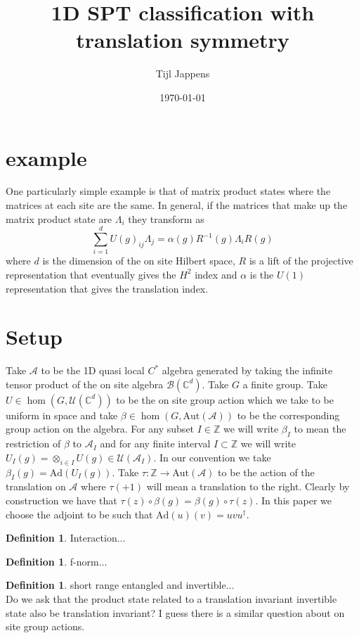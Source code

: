 \documentclass[12pt,a4paper,twoside]{article}
\title{1D SPT classification with translation symmetry}
\author{Tijl Jappens}
\date{\today}
\newcommand{\UU}{\mathcal U}
\newcommand{\BB}{\mathcal B}
\newcommand{\ZZ}{\mathbb Z}
\newcommand{\CC}{\mathbb C}
\renewcommand{\AA}{\mathcal A}
\newcommand{\Ad}{\textrm{Ad}}
\theoremstyle{definition}
\newtheorem{definition}[theorem]{Definition}
\numberwithin{equation}{section}
\begin{document}
\section{example}
One particularly simple example is that of matrix product states where the matrices at each site are the same. In general, if the matrices that make up the matrix product state are $\Lambda_i$ they transform as
\begin{equation}
	\sum_{i=1}^d U(g)_{ij}\Lambda_j=\alpha(g) R^{-1}(g)\Lambda_i R(g)
\end{equation}
where $d$ is the dimension of the on site Hilbert space, $R$ is a lift of the projective representation that eventually gives the $H^2$ index and $\alpha$ is the $U(1)$ representation that gives the translation index.
\section{Setup}
Take $\AA$ to be the 1D quasi local $C^*$ algebra generated by taking the infinite tensor product of the on site algebra $\BB(\CC^d)$. Take $G$ a finite group. Take $U\in\hom(G,\UU(\CC^d))$ to be the on site group action which we take to be uniform in space and take $\beta\in\hom(G,\text{Aut}(\AA))$ to be the corresponding group action on the algebra. For any subset $I\in\ZZ$ we will write $\beta_I$ to mean the restriction of $\beta$ to $\AA_I$ and for any finite interval $I\subset\ZZ$ we will write $U_I(g)=\otimes_{i\in I}U(g)\in\UU(\AA_I)$. In our convention we take $\beta_I(g)=\Ad(U_I(g))$. Take $\tau:\ZZ\rightarrow\text{Aut}(\AA)$ to be the action of the translation on $\AA$ where $\tau(+1)$ will mean a translation to the right. Clearly by construction we have that $\tau(z)\circ\beta(g)=\beta(g)\circ\tau(z)$. In this paper we choose the adjoint to be such that $\Ad(u)(v)=uvu^\dagger$.
\begin{definition}
	Interaction...
\end{definition}
\begin{definition}
	f-norm...
\end{definition}
\begin{definition}
	short range entangled and invertible...\\
	Do we ask that the product state related to a translation invariant invertible state also be translation invariant? I guess there is a similar question about on site group actions.
\end{definition}
\end{document}

